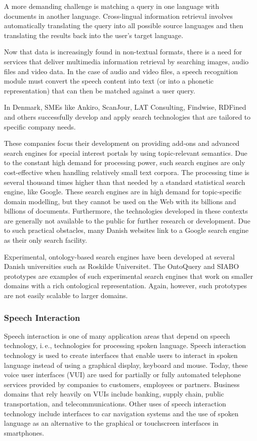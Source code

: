\documentclass[]{../../metanetpaper}
\begin{document}
\begin{multicols}{2}
A more demanding challenge is matching a query in one language with documents in another language. Cross-lingual information retrieval involves automatically translating the query into all possible source languages and then translating the results back into the user's target language.

Now that data is increasingly found in non-textual formats, there is a need for services that deliver multimedia information retrieval by searching images, audio files and video data. In the case of audio and video files, a speech recognition module must convert the speech content into text (or into a phonetic representation) that can then be matched against a user query.

In Denmark, SMEs like Ankiro, ScanJour, LAT Consulting, Findwise, RDFined and others successfully develop and apply search technologies that are tailored to specific company needs.

These companies focus their development on providing add-ons and advanced search engines for special interest portals by using topic-relevant semantics. Due to the constant high demand for processing power, such search engines are only cost-effective when handling relatively small text corpora. The processing time is several thousand times higher than that needed by a standard statistical search engine, like Google. These search engines are in high demand for topic-specific domain modelling, but they cannot be used on the Web with its billions and billions of documents. Furthermore, the technologies developed in these contexts are generally not available to the public for further research or development. Due to such practical obstacles, many Danish websites link to a Google search engine as their only search facility.

Experimental, ontology-based search engines have been developed at several Danish universities such as Roskilde Universitet. The OntoQuery and SIABO prototypes are examples of such experimental search engines that work on smaller domains with a rich ontological representation.  Again, however, such prototypes are not easily scalable to larger domains.

\subsubsection{Speech Interaction}

Speech interaction is one of many application areas that depend on speech technology, i.\,e., technologies for processing spoken language. Speech interaction technology is used to create interfaces that enable users to interact in spoken language instead of using a graphical display, keyboard and mouse.  Today, these voice user interfaces (VUI) are used for partially or fully automated telephone services provided by companies to customers, employees or partners. Business domains that rely heavily on VUIs include banking, supply chain, public transportation, and telecommunications. Other uses of speech interaction technology include interfaces to car navigation systems and the use of spoken language as an alternative to the graphical or touchscreen interfaces in smartphones.


\end{multicols}
\end{document}
